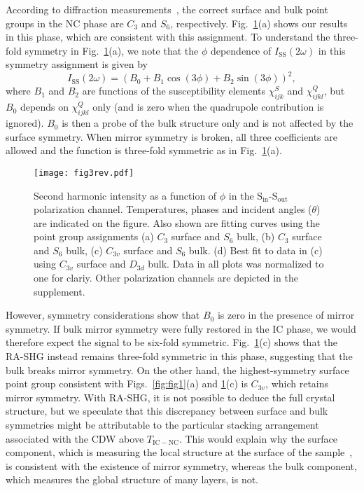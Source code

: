 According to diffraction measurements~\cite{fung_application_1980}, the correct surface and bulk point groups in the NC phase are $C_3$ and $S_6$, respectively.
Fig.~\ref{fig:fig3}(a) shows our results in this phase, which are consistent with this assignment.
To understand the three-fold symmetry in Fig.~\ref{fig:fig3}(a), we note that the $\phi$ dependence of $I_\mathrm{SS}(2\omega)$ in this symmetry assignment is given by\cite{supplementary_materials}
\begin{equation}
\label{eq:qintensityequation}
I_\mathrm{SS}(2\omega) = (B_0+B_1\cos{(3\phi)}+B_2\sin{(3\phi)})^2,
\end{equation}
where $B_1$ and $B_2$ are functions of the susceptibility elements $\chi^S_{ijk}$ and $\chi^Q_{ijkl}$, but $B_0$ depends on $\chi^Q_{ijkl}$ only (and is zero when the quadrupole contribution is ignored).
$B_0$ is then a probe of the bulk structure only and is not affected by the surface symmetry.
When mirror symmetry is broken, all three coefficients are allowed and the function is three-fold symmetric as in Fig.~\ref{fig:fig3}(a).

\begin{figure}
\texttt{[image: fig3rev.pdf]}
\caption{\label{fig:fig3} Second harmonic intensity as a function of $\phi$ in the S$_\mathrm{in}$-S$_\mathrm{out}$ polarization channel.
Temperatures, phases and incident angles ($\theta$) are indicated on the figure.
Also shown are fitting curves using the point group assignments
(a) $C_3$ surface and $S_6$ bulk,
(b) $C_3$ surface and $S_6$ bulk,
(c) $C_{3v}$ surface and $S_6$ bulk.
(d) Best fit to data in (c) using $C_{3v}$ surface and $D_{3d}$ bulk.
Data in all plots was normalized to one for clariy.
Other polarization channels are depicted in the supplement\cite{supplementary_materials}.
}
\end{figure}

However, symmetry considerations\cite{supplementary_materials} show that $B_0$ is zero in the presence of mirror symmetry.
If bulk mirror symmetry were fully restored in the IC phase, we would therefore expect the signal to be six-fold symmetric.
Fig.~\ref{fig:fig3}(c) shows that the RA-SHG instead remains three-fold symmetric in this phase, suggesting that the bulk breaks mirror symmetry.
On the other hand, the highest-symmetry surface point group consistent with Figs.~\ref{fig:fig1}(a) and \ref{fig:fig3}(c) is $C_{3v}$, which retains mirror symmetry.
With RA-SHG, it is not possible to deduce the full crystal structure, but we speculate that this discrepancy between surface and bulk symmetries might be attributable to the particular stacking arrangement associated with the CDW above $T_{\mathrm{IC-NC}}$\cite{supplementary_materials}.
This would explain why the surface component, which is measuring the local structure at the surface of the sample~\cite{bloembergen_optical_1968}, is consistent with the existence of mirror symmetry, whereas the bulk component, which measures the global structure of many layers, is not.

